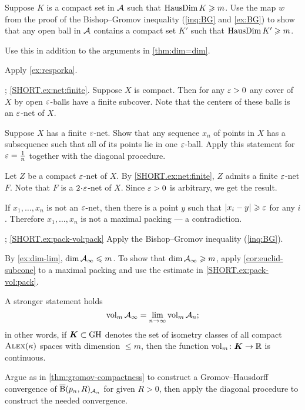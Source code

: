 Suppose $K$ is a compact set in $\mathcal{A}$ such that $\mathop{\rm HausDim}\nolimits K\geqslant m$.
Use the map $w$ from the proof of the Bishop--Gromov inequality (\ref{inq:BG} and \ref{ex:BG}) to show that any open ball in $\mathcal{A}$ contains a compact set $K'$ such that $\mathop{\rm HausDim}\nolimits K'\geqslant m$.

Use this in addition to the arguments in \ref{thm:dim=dim}. 

Apply \ref{ex:resporka}.

\parbf{\ref{ex:net}};
\ref{SHORT.ex:net:finite}.
Suppose $X$ is compact.
Then for any $\varepsilon>0$ any cover of $X$ by open $\varepsilon$-balls have a finite subcover.
Note that the centers of these balls is an $\varepsilon$-net of $X$.

Suppose $X$ has a finite $\varepsilon$-net.
Show that any sequence $x_n$ of points in $X$ has a subsequence such that all of its points lie in one $\varepsilon$-ball.
Apply this statement for $\varepsilon=\tfrac1n$ together with the diagonal procedure.

Let $Z$ be a compact $\varepsilon$-net of $X$.
By \ref{SHORT.ex:net:finite}, $Z$ admits a finite $\varepsilon$-net $F$.
Note that $F$ is a $2\cdot\eps$-net of $X$.
Since $\varepsilon>0$ is arbitrary, we get the result.


 If $x_1,\dots,x_n$ is not an $\varepsilon$-net, then there is a point $y$ such that $|{x_i}-{y}|_{}^{{}}\geqslant\varepsilon$ for any $i$.
Therefore $x_1,\dots,x_n$ is not a maximal packing --- a contradiction.

\parbf{\ref{ex:pack-vol}}; \ref{SHORT.ex:pack-vol:pack}
Apply the Bishop--Gromov inequality (\ref{inq:BG}).

\parit{\ref{SHORT.ex:pack-vol:dim}}
By \ref{ex:dim-lim}, $\operatorname{\rm dim}\nolimits\mathcal{A}_\infty\leqslant m$.
To show that $\operatorname{\rm dim}\nolimits\mathcal{A}_\infty\geqslant m$,
apply \ref{cor:euclid-subcone} to a maximal packing and use the estimate in \ref{SHORT.ex:pack-vol:pack}.

A stronger statement holds 
\[\operatorname{\rm vol}\nolimits_m\mathcal{A}_\infty=\lim_{n\to\infty} \operatorname{\rm vol}\nolimits_m\mathcal{A}_n;\]
in other words, if $\bm{K}\subset \operatorname{\rm GH}\nolimits$ denotes the set of isometry classes of all compact $\textsc{Alex}(\kappa)$ spaces with dimension $\le m$, then the function
$\operatorname{\rm vol}\nolimits_m\colon\bm{K}\to \mathbb{R}$ is continuous.


Argue as in \ref{thm:gromov-compactness} to construct a Gromov--Hausdorff convergence of $\overline{\mathrm{B}}{}(p_n,R)_{\mathcal{A}_n}$ for given $R>0$, then apply the diagonal procedure to construct the needed convergence.

